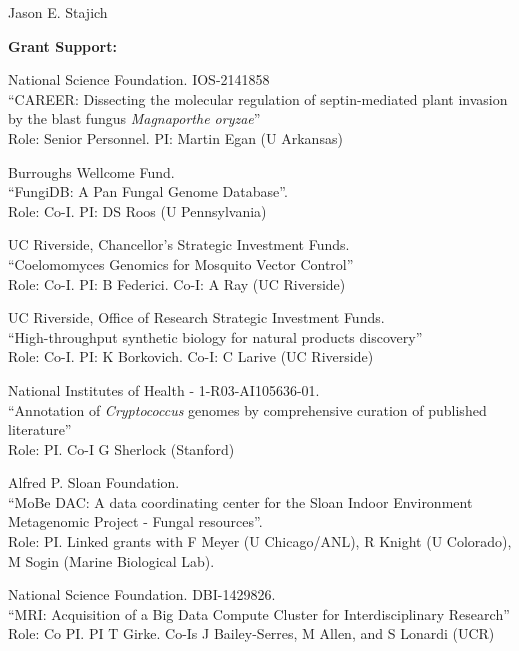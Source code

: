 \documentclass[10pt]{article}
\begin{document}
\begin{cv}{\centerline{Jason E. Stajich}}
\begin{cvlistcompact}{\bf Grant Support:}
\item [2022-2027] National Science Foundation. IOS-2141858 \\
``CAREER: Dissecting the molecular regulation of septin-mediated plant invasion by the blast fungus \textit{Magnaporthe oryzae}'' \\
Role: Senior Personnel. PI: Martin Egan (U Arkansas)

\item [{\bf Completed support}]

\item [2010-2013] Burroughs Wellcome Fund. \\
 ``FungiDB: A Pan Fungal Genome Database''. \\
Role: Co-I. PI: DS Roos (U Pennsylvania)

\item [2011-2012] UC Riverside, Chancellor's Strategic Investment
  Funds. \\
``Coelomomyces Genomics for Mosquito Vector Control'' \\
Role: Co-I. PI: B Federici. Co-I: A Ray (UC Riverside)

\item [2013-2014] UC Riverside, Office of Research Strategic Investment
  Funds. \\
``High-throughput synthetic biology for natural products discovery'' \\
Role: Co-I. PI: K Borkovich. Co-I: C Larive (UC Riverside)

\item [2013-2014] National Institutes of Health - 1-R03-AI105636-01. \\
``Annotation of \textit{Cryptococcus} genomes by comprehensive
  curation of published literature'' \\
Role: PI. Co-I G Sherlock (Stanford)

  \item [2011-2014] Alfred P. Sloan Foundation. \\
``MoBe DAC: A data coordinating center for the Sloan Indoor
Environment Metagenomic Project - Fungal resources''. \\
Role: PI.  Linked grants with F Meyer (U Chicago/ANL), R Knight (U Colorado), M Sogin (Marine Biological Lab).

\item [2014-2015] National Science Foundation. DBI-1429826. \\
``MRI: Acquisition of a Big Data Compute Cluster for Interdisciplinary
  Research''
Role: Co PI. PI T Girke. Co-Is J Bailey-Serres, M Allen, and S Lonardi (UCR)


\end{cvlistcompact}
\end{cv}
\end{document}
